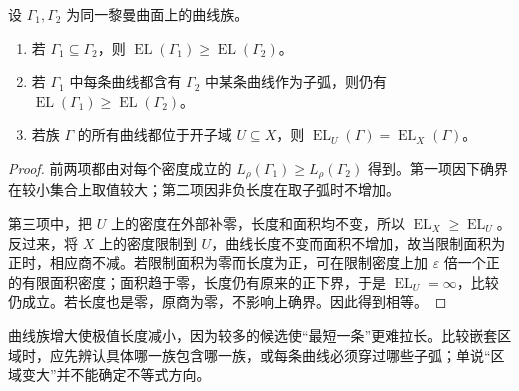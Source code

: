 \begin{proposition}
	\label{g4:prop:0505:monotonicity}
	设 \(\Gamma_1,\Gamma_2\) 为同一黎曼曲面上的曲线族。
	\begin{enumerate}
		\item 若 \(\Gamma_1\subseteq\Gamma_2\)，则 \(\operatorname{EL}(\Gamma_1)\ge\operatorname{EL}(\Gamma_2)\)。
		\item 若 \(\Gamma_1\) 中每条曲线都含有 \(\Gamma_2\) 中某条曲线作为子弧，则仍有 \(\operatorname{EL}(\Gamma_1)\ge\operatorname{EL}(\Gamma_2)\)。
		\item 若族 \(\Gamma\) 的所有曲线都位于开子域 \(U\subseteq X\)，则 \(\operatorname{EL}_U(\Gamma)=\operatorname{EL}_X(\Gamma)\)。
	\end{enumerate}
\end{proposition}
\begin{proof}
	前两项都由对每个密度成立的 \(L_\rho(\Gamma_1)\ge L_\rho(\Gamma_2)\) 得到。第一项因下确界在较小集合上取值较大；第二项因非负长度在取子弧时不增加。

	第三项中，把 \(U\) 上的密度在外部补零，长度和面积均不变，所以 \(\operatorname{EL}_X\ge\operatorname{EL}_U\)。反过来，将 \(X\) 上的密度限制到 \(U\)，曲线长度不变而面积不增加，故当限制面积为正时，相应商不减。若限制面积为零而长度为正，可在限制密度上加 \(\varepsilon\) 倍一个正的有限面积密度；面积趋于零，长度仍有原来的正下界，于是 \(\operatorname{EL}_U=\infty\)，比较仍成立。若长度也是零，原商为零，不影响上确界。因此得到相等。
\end{proof}

曲线族增大使极值长度减小，因为较多的候选使“最短一条”更难拉长。比较嵌套区域时，应先辨认具体哪一族包含哪一族，或每条曲线必须穿过哪些子弧；单说“区域变大”并不能确定不等式方向。


